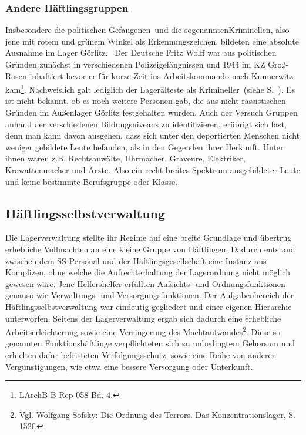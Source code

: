 \documentclass[a4paper,12pt,ngerman,
]{nisebook}
\begin{document}
\subsubsection{Andere Häftlingsgruppen}Insbesondere die \glqq politischen Gefangenen\grqq~und die sogenannten\glqq Kriminellen\grqq, also jene mit rotem und grünem Winkel als Erkennungszeichen, bildeten eine absolute Ausnahme im Lager Görlitz.~\newline
Der Deutsche Fritz Wolff war aus politischen Gründen zunächst in verschiedenen Polizeigefängnissen und 1944 im KZ Groß-Rosen inhaftiert bevor er für kurze Zeit ins Arbeitskommando nach Kunnerwitz kam\footnote{LArchB B Rep 058 Bd. 4.}. Nachweislich galt lediglich der Lagerälteste als \glqq Krimineller\grqq~(siehe S.~\pageref{czech}). Es ist nicht bekannt, ob es noch weitere Personen gab, die aus nicht rassistischen Gründen im Außenlager Görlitz festgehalten wurden.
\newline
Auch der Versuch Gruppen anhand der verschiedenen Bildungsniveaus zu identifizieren, erübrigt sich fast, denn man kann davon ausgehen, dass sich unter den deportierten Menschen nicht weniger gebildete Leute befanden, als in den Gegenden ihrer Herkunft. Unter ihnen waren z.B. Rechtsanwälte, Uhrmacher, Graveure, Elektriker, Krawattenmacher und Ärzte. Also ein recht breites Spektrum ausgebildeter Leute und keine bestimmte Berufsgruppe oder Klasse.

\subsection{Häftlingsselbstverwaltung}
Die Lagerverwaltung stellte ihr Regime auf eine breite Grundlage und übertrug erhebliche Vollmachten an eine kleine Gruppe von Häftlingen. Dadurch entstand zwischen dem SS-Personal und der Häftlingsgesellschaft eine Instanz aus Komplizen, ohne welche die Aufrechterhaltung der Lagerordnung nicht möglich gewesen wäre. Jene Helfershelfer erfüllten Aufsichts- und Ordnungsfunktionen genauso wie Verwaltungs- und Versorgungsfunktionen. Der Aufgabenbereich der Häftlingsselbstverwaltung war eindeutig gegliedert und einer eigenen Hierarchie unterworfen. Seitens der Lagerverwaltung ergab sich dadurch eine erhebliche Arbeitserleichterung sowie eine Verringerung des Machtaufwandes\footnote{Vgl. Wolfgang Sofsky: Die Ordnung des Terrors. Das Konzentrationslager, S. 152f.}. Diese so genannten Funktionshäftlinge verpflichteten sich zu unbedingtem Gehorsam und erhielten dafür befristeten Verfolgungsschutz, sowie eine Reihe von anderen Vergünstigungen, wie etwa eine bessere Versorgung oder Unterkunft.
\end{document}
